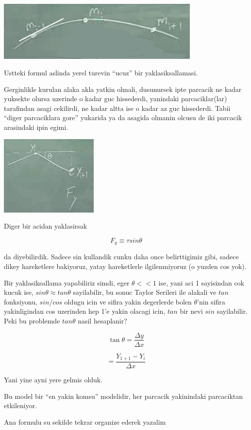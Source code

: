 \documentclass[12pt,fleqn]{article}
\begin{document}
\includegraphics[height=3cm]{1_08.png}

Ustteki formul aslinda yerel turevin ``ucuz'' bir yaklasiksallamasi. 

Gerginlikle kurulan alaka akla yatkin olmali, dusunursek ipte parcacik ne
kadar yuksekte olursa uzerinde o kadar guc hissederdi, yanindaki
parcaciklar(lar) tarafindan asagi cekilirdi, ne kadar altta ise o kadar az
guc hissederdi. Tabii ``diger parcaciklara gore'' yukarida ya da asagida
olmanin olcusu de iki parcacik arasindaki ipin egimi. 

\includegraphics[height=4cm]{1_09.png}

Diger bir acidan yaklasirsak

\[ F_y \equiv \tau sin\theta \]

da diyebilirdik. Sadece sin kullandik cunku daha once belirttigimiz gibi,
sadece dikey hareketlere bakiyoruz, yatay hareketlerle ilgilenmiyoruz (o
yuzden cos yok).

Bir yaklasiksallama yapabiliriz simdi, eger $\theta << 1$ ise, yani aci 1
sayisindan cok kucuk ise, $sin\theta \approx tan\theta$ sayilabilir, bu
sonuc Taylor Serileri ile alakali ve $tan$ fonksiyonu, $sin / cos$ oldugu
icin ve sifira yakin degerlerde bolen $\theta$'nin sifira yakinligindan cos
uzerinden hep 1'e yakin olacagi icin, $tan$ bir nevi $sin$
sayilabilir. Peki bu problemde $tan\theta$ nasil hesaplanir?

\[  \tan\theta = \frac{\Delta y}{\Delta x} \]

\[ = \frac{Y_{1+1}-Y_i}{\Delta x} \]

Yani yine ayni yere gelmis olduk. 

Bu model bir ``en yakin komsu'' modelidir, her parcacik yakinindaki
parcaciktan etkileniyor. 

Ana formulu su sekilde tekrar organize ederek yazalim
\end{document}

